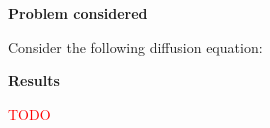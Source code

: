 \documentclass{article}
\begin{document}
\cfoot{}

\textbf{Problem considered}

Consider the following diffusion equation: 
\begin{equation}
	
\end{equation}

\textbf{Results}

\textcolor{red}{TODO}
\end{document}
